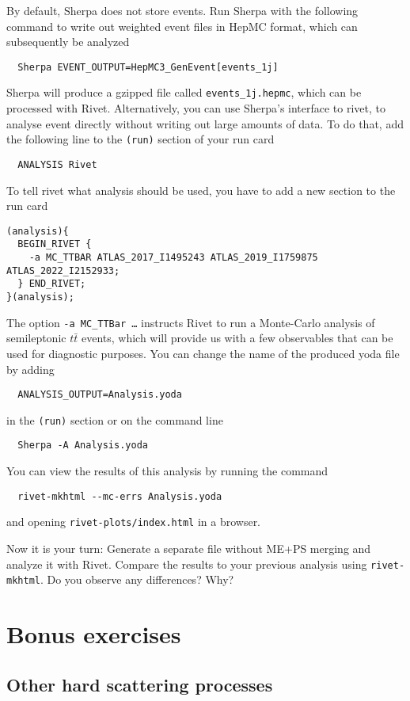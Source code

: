 \documentclass[10pt]{article}
\begin{document}
By default, Sherpa does not store events. Run Sherpa with the following command
to write out weighted event files in HepMC format, which can subsequently be analyzed
\begin{verbatim}
  Sherpa EVENT_OUTPUT=HepMC3_GenEvent[events_1j]
\end{verbatim}
Sherpa will produce a gzipped file called {\tt events\_1j.hepmc},
which can be processed with Rivet. Alternatively, you can use Sherpa's interface
to rivet, to analyse event directly without writing out large amounts of
data. To do that, add the following line to the {\tt (run)} section of your run
card
%
\begin{verbatim}
  ANALYSIS Rivet
\end{verbatim}
%
To tell rivet what analysis should be used, you have to add a new section to the
run card
\begin{verbatim}
(analysis){
  BEGIN_RIVET {
    -a MC_TTBAR ATLAS_2017_I1495243 ATLAS_2019_I1759875 ATLAS_2022_I2152933;
  } END_RIVET;
}(analysis);
\end{verbatim}
The option {\tt -a MC\_TTBar \dots} instructs Rivet to run a Monte-Carlo analysis
of semileptonic $t\bar{t}$ events, which will provide us with a few observables
that can be used for diagnostic purposes.
%
You can change the name of the produced yoda file by adding
%
\begin{verbatim}
  ANALYSIS_OUTPUT=Analysis.yoda
\end{verbatim}
in the  {\tt (run)} section or on the command line
\begin{verbatim}
  Sherpa -A Analysis.yoda
\end{verbatim}
%
You can view the results of this analysis by running the command
\begin{verbatim}
  rivet-mkhtml --mc-errs Analysis.yoda
\end{verbatim}
and opening {\tt rivet-plots/index.html} in a browser.

Now it is your turn: Generate a separate file without ME+PS merging
and analyze it with Rivet. Compare the results to your previous analysis
using {\tt rivet-mkhtml}. Do you observe any differences? Why?

\section{Bonus exercises}

\subsection{Other hard scattering processes}
\end{document}
